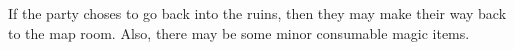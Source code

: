 If the party choses to go back into the ruins, then they may make their way back to the map room.
Also, there may be some minor consumable magic items.
